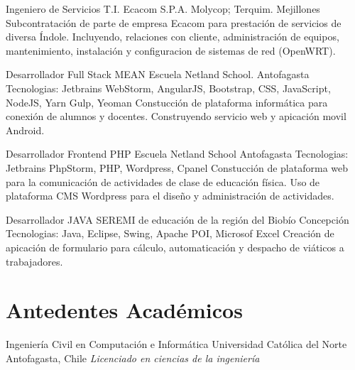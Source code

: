 \documentclass[draft,color,12pt,letterpaper,sans]{moderncv}
\begin{document}
{Ingeniero de Servicios T.I.}
{Ecacom S.P.A.}
{Molycop; Terquim. Mejillones}
{}
{Subcontrataci\'on de parte de empresa Ecacom para prestaci\'on de servicios de diversa \'Indole. Incluyendo, relaciones con cliente, administraci\'on de equipos, mantenimiento, instalaci\'on y configuracion de sistemas de red (OpenWRT).\newline}

{Desarrollador Full Stack MEAN}
{Escuela Netland School.}
{Antofagasta}
{\newline Tecnologias: Jetbrains WebStorm, AngularJS, Bootstrap, CSS, JavaScript, NodeJS, Yarn Gulp, Yeoman }
{Constucci\'on de plataforma inform\'atica para conexi\'on de alumnos y docentes. Construyendo servicio web y apicaci\'on movil Android.\newline}

{Desarrollador Frontend PHP}
{Escuela Netland School}
{Antofagasta}
{\newline Tecnologias: Jetbrains PhpStorm, PHP, Wordpress, Cpanel}
{Constucci\'on de plataforma web para la comunicaci\'on de actividades de clase de educaci\'on f\'isica. Uso de plataforma CMS Wordpress para el dise\~no y administraci\'on de actividades.\newline}

{Desarrollador JAVA}
{SEREMI de educación de la región del Biobío}
{Concepci\'on}
{\newline Tecnologias: Java, Eclipse, Swing, Apache POI, Microsof Excel}
{Creaci\'on de apicaci\'on de formulario para c\'alculo, automaticaci\'on y despacho de vi\'aticos a trabajadores.\newline}


\section{Antedentes Acad\'emicos}
{Ingenier\'ia Civil en Computaci\'on e Inform\'atica}
{Universidad Cat\'olica del Norte}
{Antofagasta, Chile}
{\textit{Licenciado en ciencias de la ingenier\'ia}}
{}
\newpage
\end{document}
